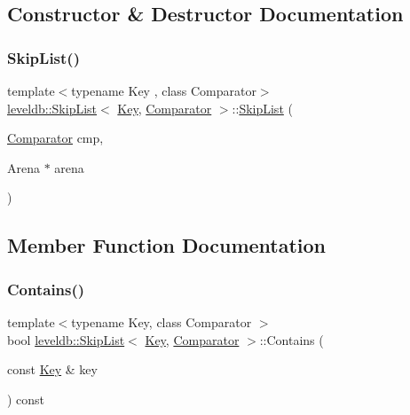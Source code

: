 \subsection{Constructor \& Destructor Documentation}
\mbox{\label{classleveldb_1_1_skip_list_a793060fb1b44b01c6f510aa16387c6ee}} 
\subsubsection{\texorpdfstring{SkipList()}{SkipList()}}
{\footnotesize\ttfamily template$<$typename Key , class Comparator$>$ \\
\mbox{\hyperlink{classleveldb_1_1_skip_list}{leveldb\+::\+Skip\+List}}$<$ \mbox{\hyperlink{namespaceleveldb_a7e9a9725b13fa0bd922d885280dfab95}{Key}}, \mbox{\hyperlink{structleveldb_1_1_comparator}{Comparator}} $>$\+::\mbox{\hyperlink{classleveldb_1_1_skip_list}{Skip\+List}} (\begin{DoxyParamCaption}\item[{\mbox{\hyperlink{structleveldb_1_1_comparator}{Comparator}}}]{cmp,  }\item[{Arena $\ast$}]{arena }\end{DoxyParamCaption})\hspace{0.3cm}{\ttfamily [explicit]}}



\subsection{Member Function Documentation}
\mbox{\label{classleveldb_1_1_skip_list_a689b9724beb6c224c01cf1b9d8699e16}} 
\subsubsection{\texorpdfstring{Contains()}{Contains()}}
{\footnotesize\ttfamily template$<$typename Key, class Comparator $>$ \\
bool \mbox{\hyperlink{classleveldb_1_1_skip_list}{leveldb\+::\+Skip\+List}}$<$ \mbox{\hyperlink{namespaceleveldb_a7e9a9725b13fa0bd922d885280dfab95}{Key}}, \mbox{\hyperlink{structleveldb_1_1_comparator}{Comparator}} $>$\+::Contains (\begin{DoxyParamCaption}\item[{const \mbox{\hyperlink{namespaceleveldb_a7e9a9725b13fa0bd922d885280dfab95}{Key}} \&}]{key }\end{DoxyParamCaption}) const}

